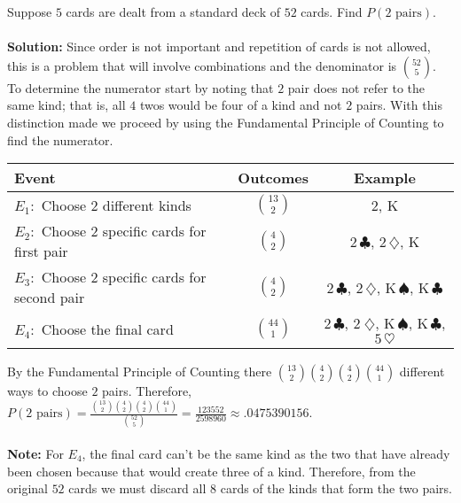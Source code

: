 \documentclass[12pt]{article}%
\newcommand{\FPC}{Fundamental Principle of Counting }
\begin{document}
\noindent Suppose $5$ cards are dealt from a standard deck of $52$ cards. Find
$P(2 \mbox{ pairs})$.\\\\
\textbf{Solution:} Since order is not important and repetition of 
cards is not allowed, this is a problem that will involve combinations and
the denominator is $\binom{52}{5}$. To determine the numerator start by noting
that $2$ pair does not refer to the same kind; that is, all $4$ twos would be
four of a kind and not $2$ pairs. With this distinction made we proceed by
using the \FPC to find the numerator. 

\begin{center}
\begin{tabular}{lcc}
Event & Outcomes & Example\\
\hline
$E_1:$ Choose $2$ different kinds & $\binom{13}{2}$ & $2$, K\\
$E_2:$ Choose $2$ specific cards for first pair & $\binom{4}{2}$ & 
$2\,\clubsuit$, $2\,\diamondsuit$, K\\
$E_3:$ Choose $2$ specific cards for second pair & $\binom{4}{2}$ & 
$2\,\clubsuit$, $2\,\diamondsuit$, K\,$\spadesuit$, K\,$\clubsuit$ \\
$E_4:$ Choose the final card & $\binom{44}{1}$ & 
$2\,\clubsuit$, $2\;\diamondsuit$, K\,$\spadesuit$, K\,$\clubsuit$, $5\,\heartsuit$ \\
\end{tabular}
\end{center}
By the \FPC there $\binom{13}{2}\binom{4}{2}\binom{4}{2}\binom{44}{1}$ different
ways to choose $2$ pairs. Therefore, $P(2 \mbox{ pairs})=\frac{\binom{13}{2}\binom{4}{2}\binom{4}{2}\binom{44}{1}}{\binom{52}{5}}=\frac{123552}{2598960} \approx .0475390156$.\\\\
\textbf{Note:} For $E_4$, the final card can't be the same kind as the two that
have already been chosen because that would create three of a kind. Therefore, 
from the original $52$ cards we must discard all $8$ cards of the kinds that form 
the two pairs. 
\end{document}
